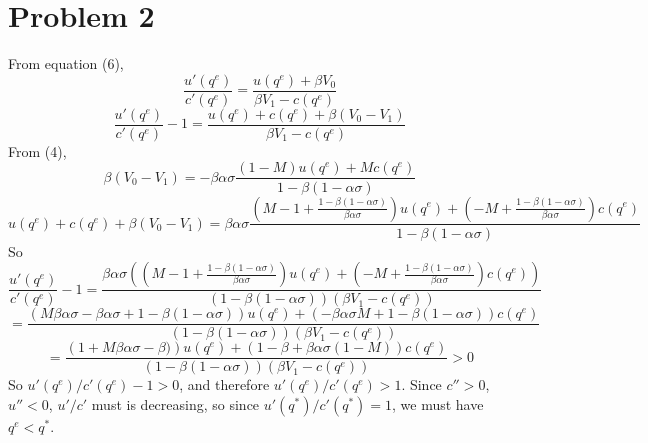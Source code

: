 \documentclass[10pt,letter]{article}
\newcommand{\problem}[1]{\section*{Problem #1}}
\begin{document}
\problem{2}From equation (6),
\[ \frac{u'(q^e)}{c'(q^e)} = \frac{u(q^e) + \beta V_0}{\beta V_1 - c(q^e)} \]
\[ \frac{u'(q^e)}{c'(q^e)} - 1 = \frac{u(q^e) + c(q^e) + \beta (V_0- V_1)}{\beta V_1 - c(q^e)} \]
From (4),
\[ \beta (V_0 - V_1) = -\beta\alpha\sigma \frac{(1-M)u(q^e) + Mc(q^e)}{1-\beta(1-\alpha\sigma)}\]
\[ u(q^e) + c(q^e) + \beta (V_0 - V_1) = \beta\alpha\sigma \frac{\left(M-1 + \frac{1-\beta(1-\alpha\sigma)}{\beta\alpha\sigma}\right)u(q^e) + \left(-M + \frac{1-\beta(1-\alpha\sigma)}{\beta\alpha\sigma} \right)c(q^e)}{1-\beta(1-\alpha\sigma)}\]
So
\[ \frac{u'(q^e)}{c'(q^e)} - 1 = \frac{\beta\alpha\sigma \left(\left(M -1+ \frac{1-\beta(1-\alpha\sigma)}{\beta\alpha\sigma}\right)u(q^e) + \left(-M + \frac{1-\beta(1-\alpha\sigma)}{\beta\alpha\sigma} \right)c(q^e)\right)}{(1-\beta(1-\alpha\sigma))(\beta V_1 - c(q^e))} \]
\[  = \frac{\left(M\beta\alpha\sigma-\beta\alpha\sigma + 1-\beta(1-\alpha\sigma)\right)u(q^e) + \left(-\beta\alpha\sigma M + 1-\beta(1-\alpha\sigma) \right)c(q^e)}{(1-\beta(1-\alpha\sigma))(\beta V_1 - c(q^e))} \]
\[  = \frac{\left(1  + M\beta\alpha\sigma -\beta )\right)u(q^e) + \left(1-\beta+\beta\alpha\sigma(1-M) \right)c(q^e)}{(1-\beta(1-\alpha\sigma))(\beta V_1 - c(q^e))} > 0 \]
So $u'(q^e)/c'(q^e) - 1 > 0$, and therefore $u'(q^e)/c'(q^e) > 1$.
Since $c'' > 0$, $u'' < 0$, $u'/c'$ must is decreasing, so since $u'(q^*)/c'(q^*) = 1$, we must have $q^e < q^*$.
\end{document}
